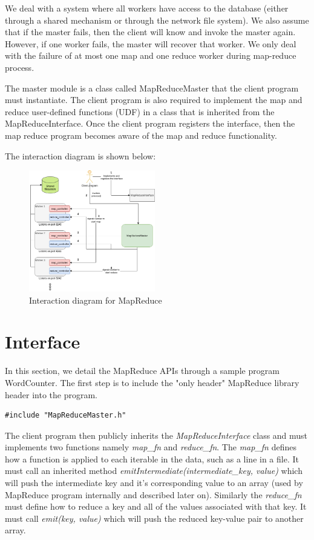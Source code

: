 \documentclass[conference, a4paper]{IEEEtran_ID}
\begin{document}
We deal with a system where all workers have access to the database (either through a shared mechanism or through the network file system). We also assume that if the master fails, then the client will know and invoke the master again. However, if one worker fails, the master will recover that worker. We only deal with the failure of at most one map and one reduce worker during map-reduce process.

The master module is a class called MapReduceMaster that the client program must instantiate. The client program is also required to implement the map and reduce user-defined functions (UDF) in a class that is inherited from the MapReduceInterface. Once the client program registers the interface, then the map reduce program becomes aware of the map and reduce functionality.

The interaction diagram is shown below:
\begin{figure}[htbp]
		\centerline{\includegraphics[width=0.49\textwidth]{interaction_diagram.png}}
		\caption{Interaction diagram for MapReduce}
\end{figure}
\section{Interface}
In this section, we detail the MapReduce APIs through a sample program WordCounter. The first step is to include the "only header" MapReduce library header into the program.
\begin{lstlisting}
#include "MapReduceMaster.h"
\end{lstlisting}

The client program then publicly inherits the \textit{MapReduceInterface} class and must implements two functions namely \textit{map\_fn} and \textit{reduce\_fn}. The \textit{map\_fn} defines how a function is applied to each iterable in the data, such as a line in a file. It must call an inherited method \textit{emitIntermediate(intermediate\_key, value)} which will push the intermediate key and it’s corresponding value to an array (used by MapReduce program internally and described later on). Similarly the \textit{reduce\_fn} must define how to reduce a key and all of the values associated with that key. It must call \textit{emit(key, value)} which will push the reduced key-value pair to another array. 
\end{document}
